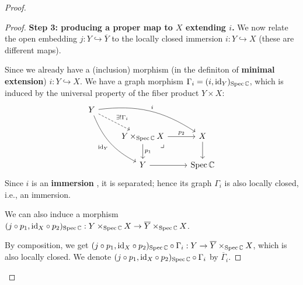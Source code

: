 \begin{remark}
\begin{proof}
\begin{enumerate}
\begin{proof}
                      \medskip

                      \textbf{Step 3: producing a proper map to $X$ extending $i$.}
                      We now relate the open embedding $j:Y\hookrightarrow \overline Y$ to the locally
                      closed immersion $i:Y\hookrightarrow X$ (these are different maps).

                      Since we already have a (inclusion) morphism (in the definiton of \textbf{minimal extension})
                      $i: Y\hookrightarrow X$. We have a graph morphism $\Gamma_i = (i, \mathrm{id}_Y)_{\operatorname{Spec} \mathbb{C}}$, which is induced by the universal property of the fiber product $Y \times X$:
                      \[
                          \begin{tikzcd}
                              Y \arrow[drr, "i", bend left=20]
                              \arrow[ddr, "\mathrm{id}_Y"', bend right=20]
                              \arrow[dr, "\exists! \Gamma_i", dashed] & & \\
                              & Y \times_{\Spec \C} X \arrow[r, "p_2"] \arrow[d, "p_1"] \arrow[dr, phantom, "\lrcorner", very near start] & X \arrow[d] \\
                              & Y \arrow[r] & \Spec \C
                          \end{tikzcd}
                      \]
                      Since $i$ is an \textbf{immersion} \cite[\href{https://stacks.math.columbia.edu/tag/01IO}{Tag 01IO}]{stacks-project}, it is separated; hence its graph $\Gamma_i$ is also locally closed, i.e., an immersion.

                      We can also induce a morphism $(j\circ p_1, \mathrm{id}_X\circ p_2)_{\operatorname{Spec} \mathbb{C}}: Y\times_{\operatorname{Spec} \mathbb{C}}X \to \overline Y \times_{\operatorname{Spec} \mathbb{C}} X$.

                      By composition, we get $(j\circ p_1, \mathrm{id}_X\circ p_2)_{\operatorname{Spec} \mathbb{C}}\circ \Gamma_i: Y\to \overline Y \times_{\operatorname{Spec} \mathbb{C}} X$, which is also locally closed.
                      We denote $(j\circ p_1, \mathrm{id}_X\circ p_2)_{\operatorname{Spec} \mathbb{C}}\circ \Gamma_i$ by $\overline{\Gamma}_i$.


\end{proof}
\end{enumerate}
\end{proof}
\end{remark}
